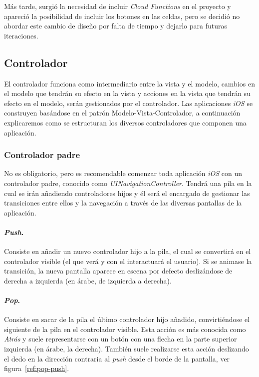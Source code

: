 Más tarde, surgió la necesidad de incluir \textit{Cloud Functions} en el proyecto y apareció la posibilidad de incluir los botones en las celdas, pero se decidió no abordar este cambio de diseño por falta de tiempo y dejarlo para futuras iteraciones.

\subsection{Controlador}
El controlador funciona como intermediario entre la vista y el modelo, cambios en el modelo que tendrán su efecto en la vista y acciones en la vista que tendrán su efecto en el modelo, serán gestionados por el controlador. Las aplicaciones \textit{iOS} se construyen basándose en el patrón Modelo-Vista-Controlador, a continuación explicaremos como se estructuran los diversos controladores que componen una aplicación.

\subsubsection*{Controlador padre}
No es obligatorio, pero es recomendable comenzar toda aplicación \textit{iOS} con un controlador padre, conocido como \textit{UINavigationController}. Tendrá una pila en la cual se irán añadiendo controladores hijos y él será el encargado de gestionar las transiciones entre ellos y la navegación a través de las diversas pantallas de la aplicación.

\paragraph{\textit{Push}.} Consiste en añadir un nuevo controlador hijo a la pila, el cual se convertirá en el controlador visible (el que verá y con el interactuará el usuario). Si se animase la transición, la nueva pantalla aparece en escena por defecto deslizándose de derecha a izquierda (en árabe, de izquierda a derecha).

\paragraph{\textit{Pop}.} Consiste en sacar de la pila el último controlador hijo añadido, convirtiéndose el siguiente de la pila en el controlador visible. Esta acción es más conocida como \textit{Atrás} y suele representarse con un botón con una flecha en la parte superior izquierda (en árabe, la derecha). También suele realizarse esta acción deslizando el dedo en la dirección contraria al \textit{push} desde el borde de la pantalla, ver figura~\ref{ref:pop-push}.


